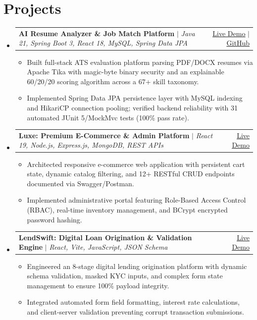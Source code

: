 \documentclass[letterpaper,10pt]{article}
\makeatletter
\newcommand{\resumeItem}[1]{
  \item\small{
    {#1 \vspace{-2pt}}
  }
}
\newcommand{\resumeProjectHeading}[2]{
    \vspace{-2pt}\item
    \begin{tabular*}{0.98\textwidth}{l@{\extracolsep{\fill}}r}
      \small#1 & #2 \\
    \end{tabular*}\vspace{-4pt}
}
\newcommand{\resumeSubHeadingListStart}{\begin{itemize}[leftmargin=0.15in, label={}]}
\newcommand{\resumeSubHeadingListEnd}{\end{itemize}}
\newcommand{\resumeItemListStart}{\begin{itemize}[leftmargin=0.15in]}
\newcommand{\resumeItemListEnd}{\end{itemize}\vspace{-4pt}}
\makeatother
\begin{document}
\section{Projects}
    \resumeSubHeadingListStart
      \resumeProjectHeading
          {\textbf{AI Resume Analyzer \& Job Match Platform} $|$ \emph{Java 21, Spring Boot 3, React 18, MySQL, Spring Data JPA}}{
          \href{https://resume-analyzer.ksvaishnavidevibca.workers.dev/}{\underline{Live Demo}} $|$ \href{https://github.com/vaishnavithulir/resume-analyzer}{\underline{GitHub}}}
          \resumeItemListStart
            \resumeItem{Built full-stack ATS evaluation platform parsing PDF/DOCX resumes via Apache Tika with magic-byte binary security and an explainable 60/20/20 scoring algorithm across a 67+ skill taxonomy.}
            \resumeItem{Implemented Spring Data JPA persistence layer with MySQL indexing and HikariCP connection pooling; verified backend reliability with 31 automated JUnit 5/MockMvc tests (100\% pass rate).}
          \resumeItemListEnd

      \resumeProjectHeading
          {\textbf{Luxe: Premium E-Commerce \& Admin Platform} $|$ \emph{React 19, Node.js, Express.js, MongoDB, REST APIs}}{
          \href{https://luxe-ecommerce-482.netlify.app/}{\underline{Live Demo}}}
          \resumeItemListStart
            \resumeItem{Architected responsive e-commerce web application with persistent cart state, dynamic catalog filtering, and 12+ RESTful CRUD endpoints documented via Swagger/Postman.}
            \resumeItem{Implemented administrative portal featuring Role-Based Access Control (RBAC), real-time inventory management, and BCrypt encrypted password hashing.}
          \resumeItemListEnd

      \resumeProjectHeading
          {\textbf{LendSwift: Digital Loan Origination \& Validation Engine} $|$ \emph{React, Vite, JavaScript, JSON Schema}}{
          \href{https://lendswift-loan.netlify.app/}{\underline{Live Demo}}}
          \resumeItemListStart
            \resumeItem{Engineered an 8-stage digital lending origination platform with dynamic schema validation, masked KYC inputs, and complex form state management to ensure 100\% payload integrity.}
            \resumeItem{Integrated automated form field formatting, interest rate calculations, and client-server validation preventing corrupt transaction submissions.}
          \resumeItemListEnd
    \resumeSubHeadingListEnd
\vspace{-6pt}
\end{document}

